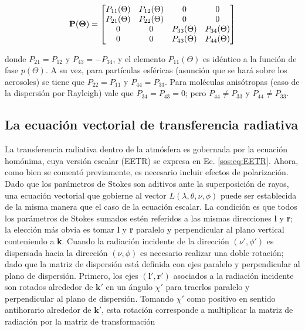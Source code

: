         \begin{equation}
        \bf{P}(\Theta)=
        \begin{bmatrix}
        {P_{11}(\Theta)}&{P_{12}(\Theta)}&{0}&{0} \\
        {P_{21}(\Theta)}&{P_{22}(\Theta)}&{0}&{0} \\
        {0}&{0}&{P_{33}(\Theta)}&{P_{34}(\Theta)}\\
        {0}&{0}&{P_{43}(\Theta)}&{P_{44}(\Theta)}\\
        \end{bmatrix}
        \label{sos:eq:lenoble10}
        \end{equation}
        
        \noindent donde $P_{21}=P_{12}$ y $P_{43}=-P_{34}$, y el elemento $P_{11}(\Theta)$ es idéntico a la función de fase $p(\Theta)$. A su vez, para partículas esféricas (asunción que se hará sobre los aerosoles) se tiene que $P_{22}=P_{11}$ y $P_{44}=P_{33}$. Para moléculas anisótropas (caso de la dispersión por Rayleigh) vale que $P_{34}=P_{43}=0$; pero $P_{44}\neq P_{33}$ y $P_{44}\neq P_{33}$.


    \subsection{La ecuación vectorial de transferencia radiativa}
    \label{sos:s:EVTR}
    
        La transferencia radiativa dentro de la atmósfera es gobernada por la ecuación homónima, cuya versión escalar (EETR) se expresa en Ec. \ref{sos:eq:EETR}. Ahora, como bien se comentó previamente, es necesario incluir efectos de polarización. Dado que los parámetros de Stokes son aditivos ante la superposición de rayos, una ecuación vectorial que gobierne al vector $L(\lambda,\theta,\nu,\phi)$ puede ser establecida de la misma manera que el caso de la ecuación escalar. La condición es que todos los parámetros de Stokes sumados estén referidos a las mismas direcciones \textbf{l} y \textbf{r}; la elección más obvia es tomar \textbf{l} y \textbf{r} paralelo y perpendicular al plano vertical conteniendo a \textbf{k}. Cuando la radiación incidente de la dirección $(\nu',\phi')$ es dispersada hacia la dirección $(\nu,\phi)$ es necesario realizar una doble rotación; dado que la matriz de dispersión está definida con ejes paralelo y perpendicular al plano de dispersión. Primero, los ejes $(\textbf{l}',\textbf{r}')$  asociados a la radiación incidente son rotados alrededor de $\textbf{k}'$ en un ángulo $\chi'$ para traerlos paralelo y perpendicular al plano de dispersión. Tomando $\chi'$ como positivo en sentido antihorario alrededor de $\textbf{k}'$, esta rotación corresponde a multiplicar la matriz de radiación por la matriz de transformación

